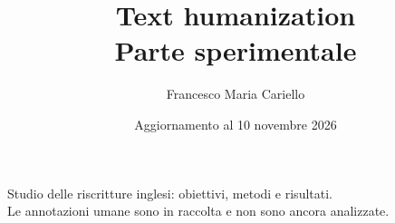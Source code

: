 \documentclass[11pt,a4paper]{article}
\title{Text humanization\\Parte sperimentale}
\author{Francesco Maria Cariello}
\date{Aggiornamento al 10 novembre 2026}
\begin{document}
\maketitle
\begin{center}
\small Studio delle riscritture inglesi: obiettivi, metodi e risultati.\\
Le annotazioni umane sono in raccolta e non sono ancora analizzate.
\end{center}
\newpage
\tableofcontents
\newpage

\end{document}
